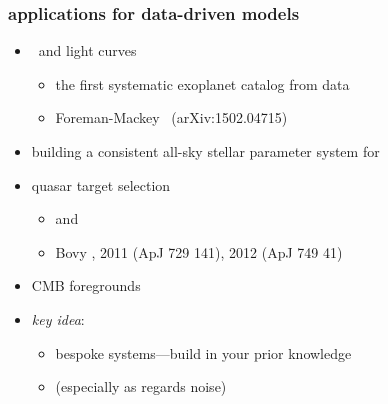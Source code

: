 \documentclass[pdftex]{beamer}
\begin{document}
\begin{frame}
  \frametitle{applications for data-driven models}
  \begin{itemize}
  \item \kepler\ and  light curves
    \begin{itemize}
    \item the first systematic exoplanet catalog from  data
    \item Foreman-Mackey \etal\ (arXiv:1502.04715)
    \end{itemize}
  \item building a consistent all-sky stellar parameter system for \gaia
  \item quasar target selection
    \begin{itemize}
    \item {} and 
    \item Bovy \etal, 2011 (ApJ 729 141), 2012 (ApJ 749 41)
    \end{itemize}
  \item CMB foregrounds
  \item<2-> \emph{key idea}:
    \begin{itemize}
    \item bespoke systems---build in your prior knowledge
    \item (especially as regards noise)
    \end{itemize}
  \end{itemize}
\end{frame}
\end{document}
